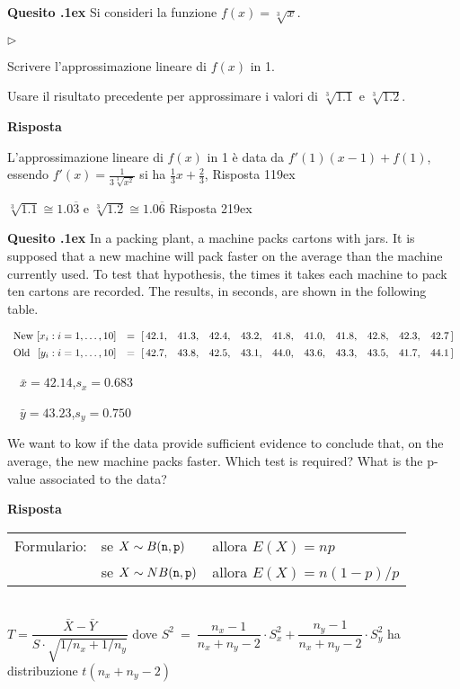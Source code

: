 \documentclass[11pt,twoside,a4paper]{article}
\newcommand{\mylabel}[1]{#1\hfill}
\renewenvironment{itemize}
  {\begin{list}{$\triangleright$}{%
   \setlength{\parskip}{0mm}
   \setlength{\topsep}{.4\baselineskip}
   \setlength{\rightmargin}{0mm}
   \setlength{\listparindent}{0mm}
   \setlength{\itemindent}{0mm}
   \setlength{\labelwidth}{2ex}
   \setlength{\itemsep}{.4\baselineskip}
   \setlength{\parsep}{0mm}
   \setlength{\partopsep}{0mm}
   \setlength{\labelsep}{1ex}
   \setlength{\leftmargin}{\labelwidth+\labelsep}
   \let\makelabel\mylabel}}{%
   \end{list}\vspace*{-1.3mm}}
\newcounter{quesito}
\newenvironment{question}{\addtocounter{quesito}{1}\par\textbf{Quesito \thequesito.\kern1ex}}{\vspace{0.5\parskip}}
\newenvironment{answer}{\par\textbf{Risposta\quad}}{\vspace{\parskip}}
\begin{document}
\begin{question}
Si consideri la funzione $f(x) = \sqrt[3]{x}$.
\begin{itemize}
\item[1.] Scrivere l'approssimazione lineare di $f(x)$ in 1.
\item[2.] Usare il risultato precedente per approssimare i valori di $\sqrt[3]{1.1}$ e $\sqrt[3]{1.2}$.
\end{itemize}
\begin{answer}

L'approssimazione lineare di $f(x)$ in 1 è data da $f'(1)(x-1) + f(1)$, essendo $f'(x) = \frac{1}{3\sqrt[3]{x^2}}$ si ha
{\color{blue}
$\frac{1}{3}x+\frac{2}{3}$,  \hfill Risposta 1\kern19ex}

{\color{blue}
$\sqrt[3]{1.1} \cong 1.0\overline{3}$ e $\sqrt[3]{1.2} \cong 1.0\overline{6}$
\hfill Risposta 2\kern19ex}

\end{answer}
\end{question}

\begin{question}
In a packing plant, a machine packs cartons with jars. It is supposed that a new machine will pack faster on the average than the machine currently used. To test that hypothesis, the times it takes each machine to pack ten cartons are recorded. The results, in seconds, are shown in the following table.

$\begin{array}{llllllllllll}
\textrm{New }[x_i:i=1,\dots,10] &=\  [\,42.1,&  41.3,&  42.4,&  43.2,&  41.8,&  41.0,&  41.8,&  42.8,&  42.3,&  42.7\,]
\\[1ex]
\textrm{Old }\hfill [y_i:i=1,\dots,10] &=\ [\,42.7,& 43.8,& 42.5,& 43.1,& 44.0,& 43.6,& 43.3,& 43.5,& 41.7,& 44.1\,]
\end{array}$\smallskip

$\quad\bar x = 42.14$,\quad$s_x= 0.683$

$\quad\bar y = 43.23$,\quad$s_y=  0.750$

We want to kow if the data provide sufficient evidence to conclude that, 
on the average, the new machine packs faster. 
Which test is required? What is the p-value associated to the data?
\begin{answer}

\end{answer}
\end{question}

\vfill\hrulefill\par
\begin{tabular}{@{}lll}
Formulario:& se $X\sim B({\tt n},{\tt p})$ & allora $E(X)=np$\\
           & se $X\sim NB({\tt n},{\tt p})$& allora $E(X)=n(1-p)/p$\\
\end{tabular}
\\[1ex]
$T=\dfrac{\bar X-\bar Y}{S\cdot\sqrt{1/n_x+1/n_y}}$
\hfill dove
$S^2\ =\ \dfrac{n_x-1}{n_x+n_y-2}\cdot S_x^2 + \dfrac{n_y-1}{n_x+n_y-2}\cdot S_y^2$
\hfill
ha distribuzione $t(n_x+n_y-2)$\\
\end{document}
